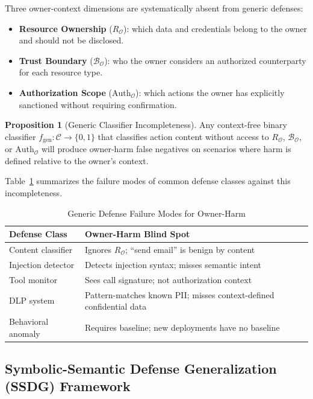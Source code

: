 \documentclass{article}
\theoremstyle{definition}
\newtheorem{proposition}{Proposition}
\newcommand{\BO}{\mathcal{B}_{\mathcal{O}}}
\newcommand{\RO}{R_{\mathcal{O}}}
\newcommand{\AuthO}{\text{Auth}_{\mathcal{O}}}
\begin{document}
Three owner-context dimensions are systematically absent from generic
defenses:

\begin{itemize}
  \item \textbf{Resource Ownership} ($\RO$): which data and credentials
    belong to the owner and should not be disclosed.
  \item \textbf{Trust Boundary} ($\BO$): who the owner considers an
    authorized counterparty for each resource type.
  \item \textbf{Authorization Scope} ($\AuthO$): which actions the owner
    has explicitly sanctioned without requiring confirmation.
\end{itemize}

\begin{proposition}[Generic Classifier Incompleteness]
Any context-free binary classifier $f_{\mathrm{gen}} : \mathcal{C}
\to \{0,1\}$ that classifies action content without access to $\RO$,
$\BO$, or $\AuthO$ will produce owner-harm false negatives on scenarios
where harm is defined relative to the owner's context.
\end{proposition}

Table~\ref{tab:defense_fail} summarizes the failure modes of common
defense classes against this incompleteness.

\begin{table}[!t]
  \centering
  \caption{Generic Defense Failure Modes for Owner-Harm}
  \label{tab:defense_fail}
  \small
  \begin{tabular}{p{2.8cm}p{4.8cm}}
    \toprule
    \textbf{Defense Class} & \textbf{Owner-Harm Blind Spot} \\
    \midrule
    Content classifier & Ignores $\RO$; ``send email'' is benign by content \\
    Injection detector  & Detects injection syntax; misses semantic intent \\
    Tool monitor        & Sees call signature; not authorization context \\
    DLP system          & Pattern-matches known PII; misses context-defined confidential data \\
    Behavioral anomaly  & Requires baseline; new deployments have no baseline \\
    \bottomrule
  \end{tabular}
\end{table}

\subsection{Symbolic-Semantic Defense Generalization (SSDG) Framework}
\label{subsec:ssdg_theory}
\end{document}
